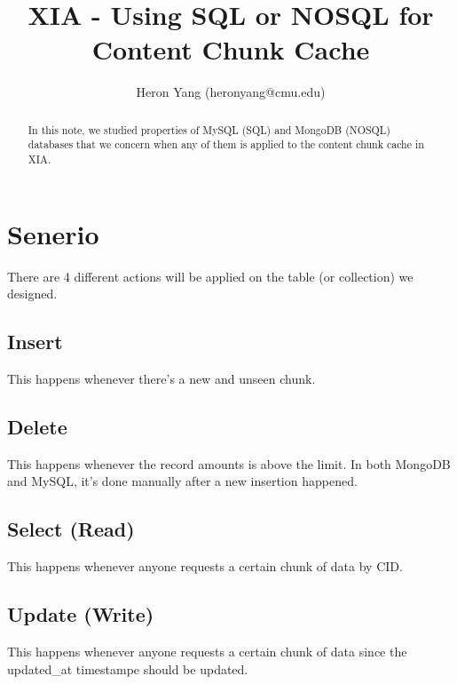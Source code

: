 \documentclass[letterpaper, 10 pt, conference]{ieeeconf}
\title{\LARGE \bf
XIA - Using SQL or NOSQL for Content Chunk Cache
}
\author{Heron Yang (heronyang@cmu.edu)
}
\begin{document}
\maketitle
\thispagestyle{empty}
\pagestyle{empty}

\begin{abstract}

    In this note, we studied properties of MySQL (SQL) and MongoDB (NOSQL) databases that we concern when any of them is applied to the content chunk cache in XIA.

\end{abstract}


\section{Senerio}

There are 4 different actions will be applied on the table (or collection) we designed.

\subsection{Insert}

This happens whenever there's a new and unseen chunk.

\subsection{Delete}

This happens whenever the record amounts is above the limit. In both MongoDB and MySQL, it's done manually after a new insertion happened.

\subsection{Select (Read)}

This happens whenever anyone requests a certain chunk of data by CID.

\subsection{Update (Write)}

This happens whenever anyone requests a certain chunk of data since the updated\_at timestampe should be updated.
\end{document}
